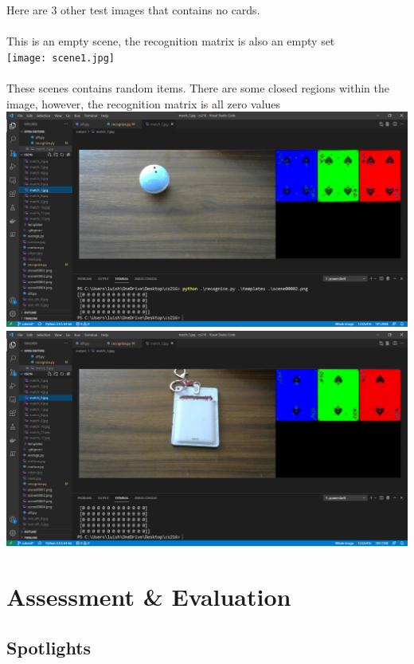 \documentclass{article}
\begin{document}
Here are 3 other test images that contains no cards.\\
\\
This is an empty scene, the recognition matrix is also an empty set\\
\texttt{[image: scene1.jpg]}\\
\\
These scenes contains random items. There are some closed regions within the image, however, the recognition matrix is all zero values\\
\includegraphics[scale=0.4]{scene2.png}\\
\includegraphics[scale=0.4]{scene3.png}

\section*{Assessment \& Evaluation}

\subsection*{Spotlights}
\end{document}
